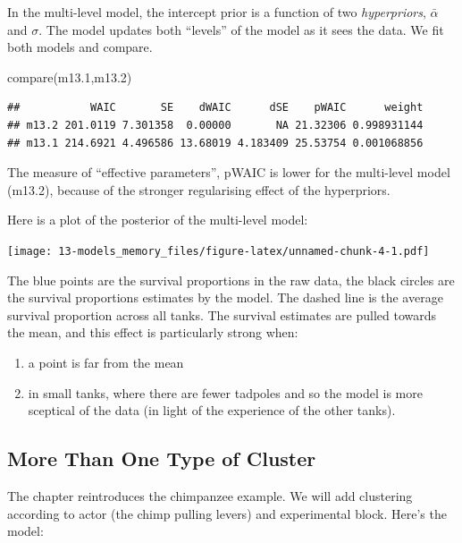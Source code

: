 \documentclass[
]{book}
\newenvironment{Shaded}{\begin{snugshade}}{\end{snugshade}}
\newcommand{\FloatTok}[1]{\textcolor[rgb]{0.00,0.00,0.81}{#1}}
\newcommand{\FunctionTok}[1]{\textcolor[rgb]{0.00,0.00,0.00}{#1}}
\newcommand{\NormalTok}[1]{#1}
\providecommand{\tightlist}{%
  \setlength{\itemsep}{0pt}\setlength{\parskip}{0pt}}
\begin{document}
In the multi-level model, the intercept prior is a function of two \emph{hyperpriors}, \(\bar{\alpha}\) and \(\sigma\). The model updates both ``levels'' of the model as it sees the data. We fit both models and compare.

\begin{Shaded}
\begin{Highlighting}[]
\FunctionTok{compare}\NormalTok{(m13}\FloatTok{.1}\NormalTok{,m13}\FloatTok{.2}\NormalTok{)}
\end{Highlighting}
\end{Shaded}

\begin{verbatim}
##           WAIC       SE    dWAIC      dSE    pWAIC      weight
## m13.2 201.0119 7.301358  0.00000       NA 21.32306 0.998931144
## m13.1 214.6921 4.496586 13.68019 4.183409 25.53754 0.001068856
\end{verbatim}

The measure of ``effective parameters'', pWAIC is lower for the multi-level model (m13.2), because of the stronger regularising effect of the hyperpriors.

Here is a plot of the posterior of the multi-level model:

\texttt{[image: 13-models\_memory\_files/figure-latex/unnamed-chunk-4-1.pdf]}

The blue points are the survival proportions in the raw data, the black circles are the survival proportions estimates by the model. The dashed line is the average survival proportion across all tanks. The survival estimates are pulled towards the mean, and this effect is particularly strong when:

\begin{enumerate}
\def\labelenumi{\arabic{enumi}.}
\tightlist
\item
  a point is far from the mean
\item
  in small tanks, where there are fewer tadpoles and so the model is more sceptical of the data (in light of the experience of the other tanks).
\end{enumerate}

\hypertarget{more-than-one-type-of-cluster}{%
\subsection*{More Than One Type of Cluster}\label{more-than-one-type-of-cluster}}

The chapter reintroduces the chimpanzee example. We will add clustering according to actor (the chimp pulling levers) and experimental block. Here's the model:
\end{document}
